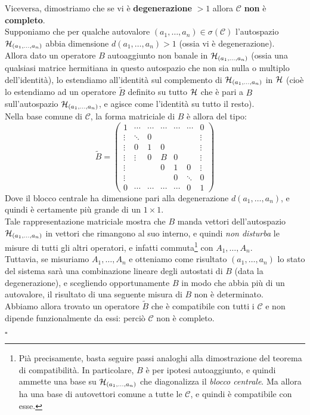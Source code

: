 \documentclass[../../FisicaTeorica.tex]{subfiles}
\begin{document}
Viceversa, dimostriamo che se vi è \textbf{degenerazione} $>1$ allora $\mathcal{C}$ \textbf{non} è \textbf{completo}.\\
Supponiamo che per qualche autovalore $(a_1, \dots, a_n) \in \sigma(\mathcal{C})$ l'autospazio $\mathcal{H}_{(a_1,\dots,a_n)}$ abbia dimensione $d(a_1, \dots, a_n)>1$ (ossia vi è degenerazione).\\
Allora dato un operatore $B$ autoaggiunto non banale in $\mathcal{H}_{(a_1,\dots, a_n)}$ (ossia una qualsiasi matrice hermitiana in questo autospazio che non sia nulla o multiplo dell'identità), lo estendiamo all'identità sul complemento di $\mathcal{H}_{(a_1,\dots, a_n)}$ in $\mathcal{H}$ (cioè lo estendiamo ad un operatore $\tilde{B}$ definito su tutto $\mathcal{H}$ che è pari a $B$ sull'autospazio $\mathcal{H}_{(a_1, \dots, a_n)}$, e agisce come l'identità su tutto il resto).\\
Nella base comune di $\mathcal{C}$, la forma matriciale di $B$ è allora del tipo:
\[
\tilde{B}=
\begin{pmatrix}
1 & \cdots & \cdots & \cdots & \cdots & \cdots & 0\\
\vdots &\ddots & 0&  &  & & \vdots\\
\vdots & 0 & 1 & 0 & & &\vdots \\
\vdots & \vdots& 0 & \boxed{B} & 0 & & \vdots \\
\vdots & & & 0 & 1 & 0 & \vdots\\
\vdots & & &\ & 0 & \ddots & 0\\
0& \cdots & \cdots& \cdots & \cdots & 0 & 1
\end{pmatrix}
\]
Dove il blocco centrale ha dimensione pari alla degenerazione $d(a_1, \dots, a_n)$, e quindi è certamente più grande di un $1\times 1$.\\
Tale rappresentazione matriciale mostra che $B$ manda vettori dell'autospazio $\mathcal{H}_{(a_1,\dots,a_n)}$ in vettori che rimangono al suo interno, e quindi \textit{non disturba} le misure di tutti gli altri operatori, e infatti commuta\footnote{Pià precisamente, basta seguire passi analoghi alla dimostrazione del teorema di compatibilità. In particolare, $B$ è per ipotesi autoaggiunto, e quindi ammette una base su $\mathcal{H}_{(a_1,\dots,a_n)}$ che diagonalizza il \textit{blocco centrale}. Ma allora ha una base di autovettori comune a tutte le $\mathcal{C}$, e quindi è compatibile con esse.} con $A_1, \dots, A_n$.\\
Tuttavia, se misuriamo $A_1,\dots,A_n$ e otteniamo come risultato $(a_1,\dots,a_n)$ lo stato del sistema sarà una combinazione lineare degli autostati di $B$ (data la degenerazione), e scegliendo opportunamente $B$ in modo che abbia più di un autovalore, il risultato di una seguente misura di $B$ non è determinato.\\
Abbiamo allora trovato un operatore $\tilde{B}$ che è compatibile con tutti i $\mathcal{C}$ e non dipende funzionalmente da essi: perciò $\mathcal{C}$ non è completo.
\begin{flushright}
$\square$
\end{flushright}
\end{document}
